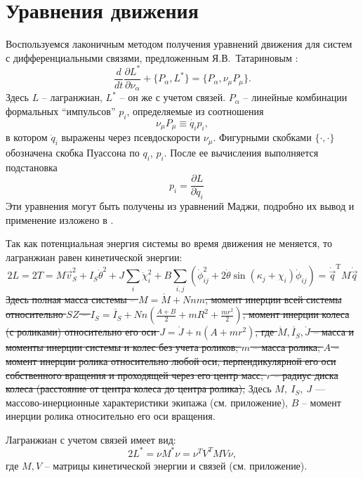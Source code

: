 \section{Уравнения движения}

Воспользуемся лаконичным методом получения уравнений движения для систем с дифференциальными связями, предложенным Я.В.~Татариновым \cite{Tatarinov}:
\begin{equation}\label{Tatarinov}
    \frac{d}{dt}\frac{\partial L^{*}}{\partial \nu_\alpha}  + \{P_\alpha, L^{*}\} = \{P_\alpha, \nu_\mu P_\mu\}.
\end{equation}
Здесь $L$ -- лагранжиан, $L^*$ -- он же с учетом связей. $P_\alpha$ -- линейные комбинации формальных ``импульсов'' $p_i$, определяемые из соотношения 
$$\nu_\mu P_\mu \equiv \dot{q_i} p_i,$$
 в котором $\dot{q}_i$ выражены через псевдоскорости $\nu_\mu$. Фигурными скобками $\{\cdot, \cdot\}$ обозначена скобка Пуассона по $q_i$, $p_i$. После ее вычисления выполняется подстановка 
$$\hspace{10pt} p_i = \frac{\partial L}{\partial \dot{q}_i}$$
Эти уравнения могут быть получены из уравнений Маджи, подробно их вывод и применение изложено в \cite{Tatarinov,Zobova2011,Zobova_ND}.

Так как потенциальная энергия системы во время движения не меняется, то лагранжиан  равен кинетической энергии:
\begin{equation}\label{kin_en}
    2L = 2T = M\vec{v}_S^2 + I_S\dot{\theta}^2 + J\sum_i\dot{\chi}_i^2 + B\sum_{i,j}(\dot{\phi}_{ij}^2 + 2\dot{\theta}\sin(\kappa_j + \chi_i)\dot{\phi}_{ij})=\dot{\vec{q}}^\mathrm{T}M\dot{\vec{q}}
\end{equation}
\sout{Здесь полная масса системы -- $M = \mathring{M} + Nnm$, момент инерции всей системы относительно $SZ$ -- $I_S = \mathring{I_S} + Nn(\frac{A+B}{2} + mR^2 + \frac{mr^2}{2})$, момент инерции колеса (с роликами) относительно его оси $J = \mathring{J} + n(A + mr^2)$, где $\mathring{M}, \mathring{I_S}, \mathring{J}$ -- масса и моменты инерции системы и колес без учета роликов; $m$ -- масса ролика; $A$ -- момент инерции ролика относительно любой оси, перпендикулярной его оси собственного вращения и проходящей через его центр масс; $r$ -- радиус диска колеса (расстояние от центра колеса до центра ролика),}
Здесь $M,\ I_S,\ J$ --- массово-инерционные характеристики экипажа (см. приложение), $B$ -- момент инерции ролика относительно его оси вращения.

Лагранжиан с учетом связей имеет вид:
$$ 2L^{*} = \nu M^*\nu = \nu^T V^TMV\nu, $$
где $M, V$ -- матрицы кинетической энергии и связей (см. приложение).


